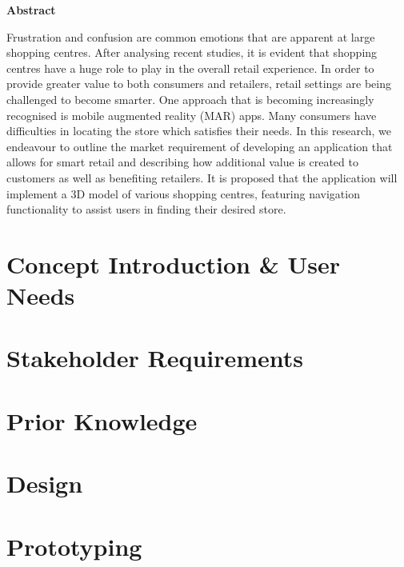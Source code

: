 \documentclass[12pt]{report}
\newcommand\blankpage{%
    \null
    \thispagestyle{empty}%
    \addtocounter{page}{-1}%
    \newpage}
\begin{document}
\begin{center}    
    \large
    \textbf{Abstract}\\
\end{center}
Frustration and confusion are common emotions that are apparent at large shopping centres. After analysing recent studies, it is evident that shopping centres have a huge role to play in the overall retail experience. In order to provide greater value to both consumers and retailers, retail settings are being challenged to become smarter. One approach that is becoming increasingly recognised is mobile augmented reality (MAR) apps. Many consumers have difficulties in locating the store which satisfies their needs. In this research, we endeavour to outline the market requirement of developing an application that allows for smart retail and describing how additional value is created to customers as well as benefiting retailers. It is proposed that the application will implement a 3D model of various shopping centres, featuring navigation functionality to assist users in finding their desired store.\\


\tableofcontents
\afterpage{\blankpage}

\chapter{Concept Introduction \& User Needs}


\chapter{Stakeholder Requirements}


\chapter{Prior Knowledge}


\chapter{Design}


\chapter{Prototyping}

\end{document}
